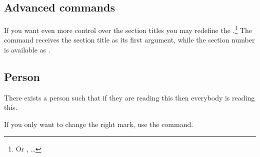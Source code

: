 \subsection{Advanced commands}

If you want even more control over the section titles you may redefine the
.\footnote{Or ,  \ldots} The
command receives the section title as its first argument, while the section
number is available as .
\begin{example}[standalone, paperheight=4.5cm, paperwidth=4cm]
\geometry{includehead, includefoot, headsep=.5em, footskip=1em} %
\sloppy %
\usepackage{fancyhdr}%
\usepackage{extramarks}%
\pagestyle{fancy}%
\fancyhead[R]{\firstleftmark}

\section{Person}
There exists a person such that
if they are reading this then
everybody is reading this.
\end{example}
If you only want to change the right mark, use the  command.

